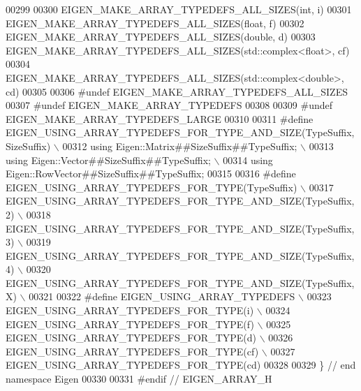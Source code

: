 \begin{DoxyCode}
00299 
00300 EIGEN\_MAKE\_ARRAY\_TYPEDEFS\_ALL\_SIZES(\textcolor{keywordtype}{int},                  i)
00301 EIGEN\_MAKE\_ARRAY\_TYPEDEFS\_ALL\_SIZES(\textcolor{keywordtype}{float},                f)
00302 EIGEN\_MAKE\_ARRAY\_TYPEDEFS\_ALL\_SIZES(\textcolor{keywordtype}{double},               d)
00303 EIGEN\_MAKE\_ARRAY\_TYPEDEFS\_ALL\_SIZES(std::complex<float>,  cf)
00304 EIGEN\_MAKE\_ARRAY\_TYPEDEFS\_ALL\_SIZES(std::complex<double>, cd)
00305 
00306 \textcolor{preprocessor}{#undef EIGEN\_MAKE\_ARRAY\_TYPEDEFS\_ALL\_SIZES}
00307 \textcolor{preprocessor}{#undef EIGEN\_MAKE\_ARRAY\_TYPEDEFS}
00308 
00309 \textcolor{preprocessor}{#undef EIGEN\_MAKE\_ARRAY\_TYPEDEFS\_LARGE}
00310 
00311 \textcolor{preprocessor}{#define EIGEN\_USING\_ARRAY\_TYPEDEFS\_FOR\_TYPE\_AND\_SIZE(TypeSuffix, SizeSuffix) \(\backslash\)}
00312 \textcolor{preprocessor}{using Eigen::Matrix##SizeSuffix##TypeSuffix; \(\backslash\)}
00313 \textcolor{preprocessor}{using Eigen::Vector##SizeSuffix##TypeSuffix; \(\backslash\)}
00314 \textcolor{preprocessor}{using Eigen::RowVector##SizeSuffix##TypeSuffix;}
00315 
00316 \textcolor{preprocessor}{#define EIGEN\_USING\_ARRAY\_TYPEDEFS\_FOR\_TYPE(TypeSuffix) \(\backslash\)}
00317 \textcolor{preprocessor}{EIGEN\_USING\_ARRAY\_TYPEDEFS\_FOR\_TYPE\_AND\_SIZE(TypeSuffix, 2) \(\backslash\)}
00318 \textcolor{preprocessor}{EIGEN\_USING\_ARRAY\_TYPEDEFS\_FOR\_TYPE\_AND\_SIZE(TypeSuffix, 3) \(\backslash\)}
00319 \textcolor{preprocessor}{EIGEN\_USING\_ARRAY\_TYPEDEFS\_FOR\_TYPE\_AND\_SIZE(TypeSuffix, 4) \(\backslash\)}
00320 \textcolor{preprocessor}{EIGEN\_USING\_ARRAY\_TYPEDEFS\_FOR\_TYPE\_AND\_SIZE(TypeSuffix, X) \(\backslash\)}
00321 \textcolor{preprocessor}{}
00322 \textcolor{preprocessor}{#define EIGEN\_USING\_ARRAY\_TYPEDEFS \(\backslash\)}
00323 \textcolor{preprocessor}{EIGEN\_USING\_ARRAY\_TYPEDEFS\_FOR\_TYPE(i) \(\backslash\)}
00324 \textcolor{preprocessor}{EIGEN\_USING\_ARRAY\_TYPEDEFS\_FOR\_TYPE(f) \(\backslash\)}
00325 \textcolor{preprocessor}{EIGEN\_USING\_ARRAY\_TYPEDEFS\_FOR\_TYPE(d) \(\backslash\)}
00326 \textcolor{preprocessor}{EIGEN\_USING\_ARRAY\_TYPEDEFS\_FOR\_TYPE(cf) \(\backslash\)}
00327 \textcolor{preprocessor}{EIGEN\_USING\_ARRAY\_TYPEDEFS\_FOR\_TYPE(cd)}
00328 
00329 \} \textcolor{comment}{// end namespace Eigen}
00330 
00331 \textcolor{preprocessor}{#endif // EIGEN\_ARRAY\_H}
\end{DoxyCode}
